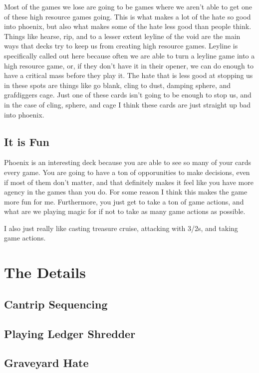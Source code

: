 \documentclass[12pt]{article}
\begin{document}
Most of the games we lose are going to be games where we aren't able to get one of these high resource games going. This is what makes a lot of the hate so good into phoenix, but also what makes some of the hate less good than people think. Things like hearse, rip, and to a lesser extent leyline of the void are the main ways that decks try to keep us from creating high resource games. Leyline is specifically called out here because often we are able to turn a leyline game into a high resource game, or, if they don't have it in their opener, we can do enough to have a critical mass before they play it. The hate that is less good at stopping us in these spots are things like go blank, cling to dust, damping sphere, and grafdiggers cage. Just one of these cards isn't going to be enough to stop us, and in the case of cling, sphere, and cage I think these cards are just straight up bad into phoenix.

\subsection{It is Fun}
Phoenix is an interesting deck because you are able to see so many of your cards every game. You are going to have a ton of opporunities to make decisions, even if most of them don't matter, and that definitely makes it feel like you have more agency in the games than you do. For some reason I think this makes the game more fun for me. Furthermore, you just get to take a ton of game actions, and what are we playing magic for if not to take as many game actions as possible.

\vspace{0.4em}
\noindent I also just really like casting treasure cruise, attacking with 3/2s, and taking game actions.

\clearpage
\section{The Details}
\subsection{Cantrip Sequencing}

\subsection{Playing Ledger Shredder}

\subsection{Graveyard Hate}
\end{document}

